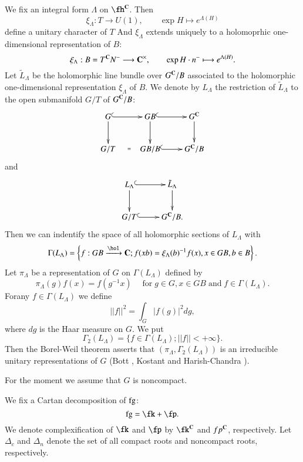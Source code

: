 We fix an integral form $\Lambda$ on $\fh^{\bC}$. Then
$$
\xi_{\Lambda} : T \longrightarrow U(1), \qquad \exp H \longmapsto e^{\Lambda(H)} 
$$ 
define a unitary character of $T$ And $\xi_{\Lambda}$ extends uniquely to a holomoprhic one-dimensional representation of $B$:
$$
\xi_{\Lambda}: B = T^{\mathbf{C}}N^{-} \longrightarrow \mathbf{C}^{\times}, \qquad \exp H \cdot n^{-} \longmapsto e^{\Lambda(H)}.
$$
Let $\tilde{L}_{\Lambda}$ be the holomorphic line bundle over $G^{\mathbf{C}}/B$ associated to the holomorphic one-dimensional representation $\xi_{\Lambda}$ of $B$. We denote by $L_{\Lambda}$ the restriction of $\tilde{L}_{\Lambda}$ to the open submanifold $G/T$ of $G^{\mathbf{C}}/B$:
$$
\xymatrix{
G \ar[d]\ar@{^{(}->}[r] & GB \ar[d] \ar@{^{(}->}[r] & G^{\bC}\ar[d]\\
G/T \ar@{}[r]|{=} & GB/B \ar@{^{(}->}[r] & G^{\bC}/B
}
$$
and
$$
\xymatrix{
L_{\Lambda}\ar[d]\ar@{^{(}->}[r]& \tilde{L}_{\Lambda}\ar[d]\\
G/T \ar@{^{(}->}[r] & G^{\bC}/B.
}
$$
Then we can indentify the space of all holomorphic sections of $L_{\Lambda}$ with
$$
\Gamma(L_{\Lambda})= \left\{f : GB \xrightarrow{\hol}\bC ; f(xb) = \xi_{\Lambda}(b)^{-1}f(x), x \in GB, b\in B \right\}.
$$
Let $\pi_{\Lambda}$ be a representation of $G$ on $\Gamma(L_{\Lambda})$ defined by
$$
\pi_{\Lambda} (g)f(x)= f(g^{-1}x) \quad \;\text{for}\; g \in G, x \in GB\; \text{and}\; f \in \Gamma(L_{\Lambda}).
$$
For\pageoriginale any $f \in \Gamma(L_{\Lambda})$ we define
$$
||f||^{2} = \int_{G} |f(g)|^{2}dg,
$$
where $dg$ is the Haar measure on $G$. We put
$$
\Gamma_{2}(L_{\Lambda})= \{f \in \Gamma (L_{\Lambda}); ||f|| < + \infty\}.
$$
Then the Borel-Weil theorem asserts that $(\pi_{\Lambda}, \Gamma_{2}(L_{\Lambda}))$ is an irreducible unitary representations of $G$ (Bott \cite{chap15-key1}, Kostant \cite{chap15-key8} and Harish-Chandra \cite{chap15-key2} \cite{chap15-key3} \cite{chap15-key4}).

For the moment we assume that $G$ is noncompact.

We fix a Cartan decomposition of $\operatorname{fg}$:
$$
\fg = \fk + \fp.
$$
We denote complexification of $\fk$ and $\fp$ by $\fk^{\bC}$ and $fp^{\mathbf{C}}$, respectively. Let $\Delta_{c}$ and $\Delta_{n}$ denote the set of all compact roots and noncompact roots, respectively.

